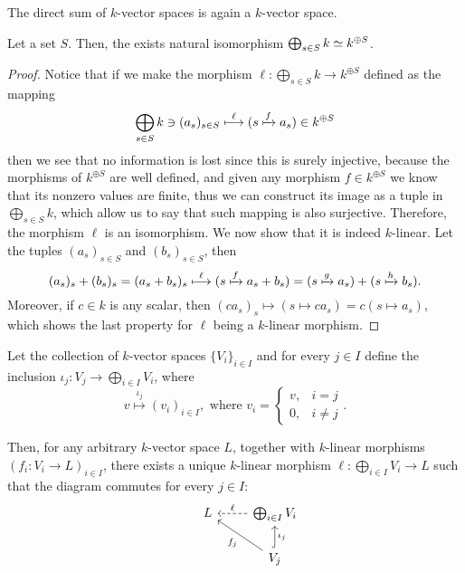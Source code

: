 \begin{proposition}
   The direct sum of \(k\)-vector spaces is again a \(k\)-vector space.
\end{proposition}

\begin{proposition}
   Let a set \(S\). Then, the exists natural isomorphism \(\bigoplus_{s \in S} k
   \simeq k^{\oplus S}\).
\end{proposition}

\begin{proof}
   Notice that if we make the morphism \(\ell : \bigoplus_{s \in S} k \to
   k^{\oplus S}\) defined as the mapping
   \[
      \bigoplus_{s \in S} k \ni (a_s)_{s \in S} \overset{\ell}\longmapsto (s
      \xmapsto{f} a_s) \in k^{\oplus S}
   \]
   then we see that no information is lost since this is surely injective,
   because the morphisms of \(k^{\oplus S}\) are well defined, and given any
   morphism \(f \in k^{\oplus S}\) we know that its nonzero values are finite,
   thus we can construct its image as a tuple in \(\bigoplus_{s \in S} k\),
   which allow us to say that such mapping is also surjective. Therefore, the
   morphism \(\ell\) is an isomorphism. We now show that it is indeed
   \(k\)-linear. Let the tuples \((a_s)_{s \in S}\) and \((b_s)_{s \in S}\),
   then
   \[
      (a_s)_s + (b_s)_s = (a_s + b_s)_s \overset \ell \longmapsto (s \xmapsto f
      a_s + b_s) = (s \xmapsto g a_s) + (s \xmapsto h b_s).
   \]
   Moreover, if \(c \in k\) is any scalar, then \((c a_s)_s \longmapsto (s
   \mapsto c a_s) = c (s \mapsto a_s)\), which shows the last property for
   \(\ell\) being a \(k\)-linear morphism.
\end{proof}

\begin{proposition}
   Let the collection of \(k\)-vector spaces \(\{V_i\}_{i \in I}\) and for every
   \(j \in I\) define the inclusion \(\iota_j : V_j \to \bigoplus_{i \in I}
   V_i\), where
   \[
      v \overset{\iota_j}\longmapsto (v_i)_{i \in I}, \text{ where } v_i =
      \begin{cases}
         v, &i = j \\
         0, &i \neq j
      \end{cases}.
   \]

   Then, for any arbitrary \(k\)-vector space \(L\), together with \(k\)-linear
   morphisms \((f_i : V_i \to L)_{i \in I}\), there exists a unique \(k\)-linear
   morphism \(\ell : \bigoplus_{i \in I} V_i \to L\) such that the diagram
   commutes for every \(j \in I\):
   \[
      \begin{tikzcd}
         &L &\bigoplus_{i \in I} V_i \ar[l, dashed, swap, "\ell"]  \\
         & &V_j \ar[u, hook, swap, "\iota_j"] \ar[ul, "f_j"]
      \end{tikzcd}
   \]
\end{proposition}

